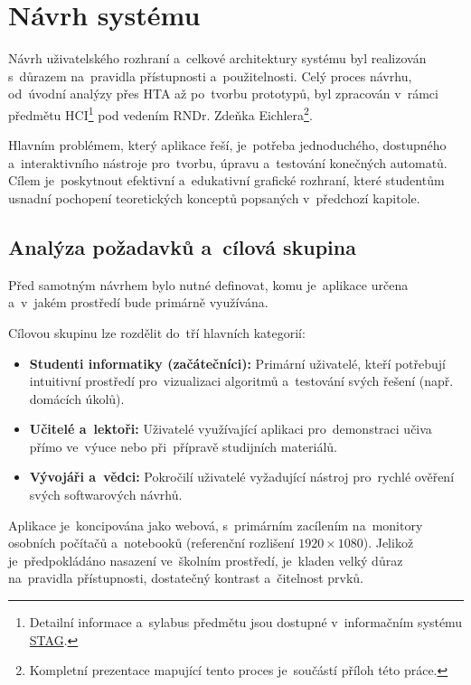 \documentclass[
  master,
  program=ainfvs,
  printversion,
  figures=false,
  tables=false,
  glossaries,
  index
]{kidiplom}
\begin{document}
\section{Návrh systému}
Návrh uživatelského rozhraní a~celkové architektury systému byl realizován s~důrazem na~pravidla přístupnosti a~použitelnosti. Celý proces návrhu, od~úvodní analýzy přes \gls{HTA} až po~tvorbu prototypů, byl zpracován v~rámci předmětu \gls{HCI}\footnote{Detailní informace a~sylabus předmětu jsou dostupné v~informačním systému \href{https://stag.upol.cz/portal/studium/prohlizeni.html?pc_pagenavigationalstate=AAAAAQAFMTM1MzkTAQAAAAEACHN0YXRlS2V5AAAAAQAULTkyMjMzNzIwMzY4NTQ3NzIyNzMAAAAA\#prohlizeniSearchResult}{STAG}.} pod vedením RNDr. Zdeňka Eichlera\footnote{Kompletní prezentace mapující tento proces je~součástí příloh této práce.}.

Hlavním problémem, který aplikace řeší, je~potřeba jednoduchého, dostupného a~interaktivního nástroje pro~tvorbu, úpravu a~testování konečných automatů. Cílem je~poskytnout efektivní a~edukativní grafické rozhraní, které studentům usnadní pochopení teoretických konceptů popsaných v~předchozí kapitole.

\subsection{Analýza požadavků a~cílová skupina}
Před samotným návrhem bylo nutné definovat, komu je~aplikace určena a~v~jakém prostředí bude primárně využívána. 

Cílovou skupinu lze rozdělit do~tří hlavních kategorií:
\begin{itemize}
    \item \textbf{Studenti informatiky (začátečníci):} Primární uživatelé, kteří potřebují intuitivní prostředí pro~vizualizaci algoritmů a~testování svých řešení (např. domácích úkolů).
    \item \textbf{Učitelé a~lektoři:} Uživatelé využívající aplikaci pro~demonstraci učiva přímo ve~výuce nebo při~přípravě studijních materiálů.
    \item \textbf{Vývojáři a~vědci:} Pokročilí uživatelé vyžadující nástroj pro~rychlé ověření svých softwarových návrhů.
\end{itemize}

Aplikace je~koncipována jako webová, s~primárním zacílením na~monitory osobních počítačů a~notebooků (referenční rozlišení $1920 \times 1080$). Jelikož je~předpokládáno nasazení ve~školním prostředí, je~kladen velký důraz na~pravidla přístupnosti, dostatečný kontrast a~čitelnost prvků.
\end{document}
